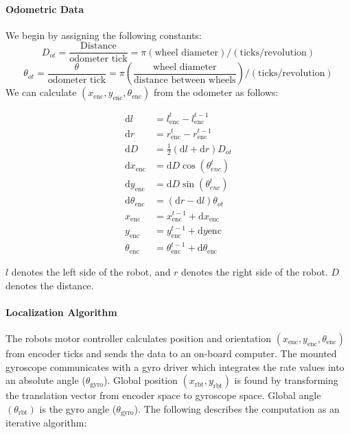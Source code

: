\paragraph{Odometric Data}
We begin by assigning the following constants: 
\[D_{ot}=\frac{\text{Distance}}{\text{odometer tick}}=\pi(\text{wheel diameter})/(\text{ticks/revolution})\]\[ \theta_{ot} = \frac{\theta}{\text{odometer tick}} = \pi\left(\frac{\text{wheel diameter}}{\text{distance between wheels}}\right)/(\text{ticks/revolution})\]
We can calculate $(x_{\mathrm{enc}}, y_{\mathrm{enc}}, \theta_{\mathrm{enc}})$ from the odometer as follows: 
\begin{center}
	\begin{align*}
		\mathrm{d}l &= l^t_{\mathrm{enc}}-l^{t-1}_{\mathrm{enc}} \\
		\mathrm{d}r &= r^t_{\mathrm{enc}}-r^{t-1}_{\mathrm{enc}} \\
		\mathrm{d}D &= \frac{1}{2}(\mathrm{d}l+\mathrm{d}r)D_{ot} \\
		\mathrm{d}x_{\mathrm{enc}} &= \mathrm{d}D\cos(\theta^t_{enc}) \\
		\mathrm{d}y_{\mathrm{enc}} &= \mathrm{d}D\sin(\theta^t_{enc}) \\
		\mathrm{d}\theta_{\mathrm{enc}} &= (\mathrm{d}r-\mathrm{d}l)\theta_{ot} \\
		x_{\mathrm{enc}} &= x^{t-1}_{\mathrm{enc}} + \mathrm{d}x_{\mathrm{enc}} \\
		y_{\mathrm{enc}} &= y^{t-1}_{\mathrm{enc}} + \mathrm{d}y{\mathrm{enc}} \\
		\theta_{\mathrm{enc}} &= \theta^{t-1}_{\mathrm{enc}} + \mathrm{d}\theta_{\mathrm{enc}}
	\end{align*}
\end{center}

$l$ denotes the left side of the robot, and $r$ denotes the right side of the robot. $D$ denotes the distance. 

\paragraph{Localization Algorithm}
The robots motor controller calculates position and orientation $(x_{\mathrm{enc}}, y_{\mathrm{enc}}, \theta_{\mathrm{enc}})$ from encoder ticks and sends the data to an on-board computer. The mounted gyroscope communicates with a gyro driver which integrates the rate values into an absolute angle ($\theta_{\mathrm{gyro}}$). Global position $(x_{\mathrm{rbt}}, y_{\mathrm{rbt}})$ is found by transforming the translation vector from encoder space to gyroscope space. Global angle $(\theta_{\mathrm{rbt}})$ is the gyro angle ($\theta_{\mathrm{gyro}}$). The following describes the computation as an iterative algorithm: 

